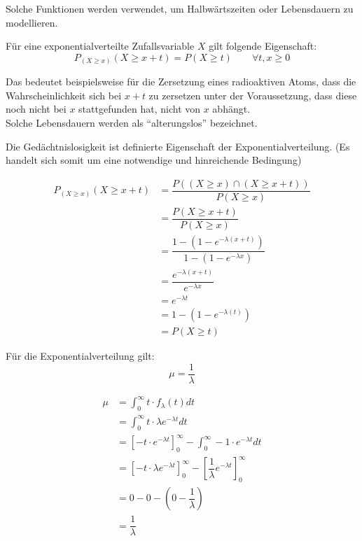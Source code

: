 \documentclass[main.tex]{subfiles}
\begin{document}
\begin{Bemerkung}
  Solche Funktionen werden verwendet, um Halbwärtszeiten oder Lebensdauern zu modellieren.
\end{Bemerkung}

\begin{Theorem}[Gedächtnislosigkeit]
  Für eine exponentialverteilte Zufallsvariable $X$ gilt folgende Eigenschaft:
  $$P_{(X \geq x)}(X \geq x+t) = P(X \geq t)\qquad \forall t,x \geq 0$$
\end{Theorem}

\begin{Bemerkung}
  Das bedeutet beispielsweise für die Zersetzung eines radioaktiven Atoms, dass die Wahrscheinlichkeit sich bei $x+t$ zu zersetzen unter der Voraussetzung, dass diese noch nicht bei $x$ stattgefunden hat, nicht von $x$ abhängt.\\
  Solche Lebensdauern werden als ``alterungslos'' bezeichnet.
\end{Bemerkung}

\begin{Bemerkung}
  Die Gedächtnislosigkeit ist definierte Eigenschaft der Exponentialverteilung. (Es handelt sich somit um eine notwendige und hinreichende Bedingung)
\end{Bemerkung}

\begin{Beweis}
  \begin{align*}
    P_{(X \geq x)}(X \geq x+t) &= \dfrac{P((X \geq x)\cap(X \geq x+t))}{P(X \geq x)}\\
    &= \dfrac{P(X \geq x+t)}{P(X \geq x)}\\
    &= \dfrac{1-(1-e^{-\lambda(x+t)})}{1-(1-e^{-\lambda x})}\\
    &= \dfrac{e^{-\lambda(x+t)}}{e^{-\lambda x}}\\
    &= e^{-\lambda t}\\
    &= 1-(1-e^{-\lambda(t)})\\
    &= P(X \geq t)
  \end{align*}
\end{Beweis}

\begin{Theorem}[Erwartungswert]
  Für die Exponentialverteilung gilt:
  $$ \mu = \dfrac{1}{\lambda}$$
\end{Theorem}
\begin{Beweis}
  \begin{align*}
    \mu &= \int_0^{\infty} t \cdot f_\lambda (t)dt\\
    &= \int_0^{\infty} t \cdot \lambda e^{-\lambda t} dt\\
    &= \left[-t \cdot e^{-\lambda t}\right]_0^\infty - \int_0^{\infty} -1 \cdot e^{-\lambda t} dt\\
    &= \left[-t \cdot \lambda e^{-\lambda t}\right]_0^\infty - \left[\dfrac{1}{\lambda} e^{-\lambda t}\right]_0^\infty\\
    &= 0-0-\left(0-\dfrac{1}{\lambda}\right)\\
    &= \dfrac{1}{\lambda}
  \end{align*}
\end{Beweis}
\end{document}
